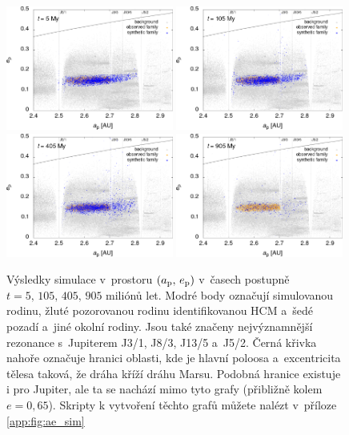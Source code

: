 \documentclass[A4paper, 12pt, oneside]{book}
\begin{document}
\immediate{}
\immediate{}
\immediate{}
\immediate{}
\begin{figure}
	\centering
	\includegraphics[width=0.49\textwidth]{obr/ae_5t.png}
	\includegraphics[width=0.49\textwidth]{obr/ae_105t.png}\\
	\includegraphics[width=0.49\textwidth]{obr/ae_405t.png}
	\includegraphics[width=0.49\textwidth]{obr/ae_905t.png}
	\caption{Výsledky simulace v~prostoru $(a_{\rm p},\,e_{\rm p})$ v~časech postupně $t=5,\,105,\,405,\,905$ miliónů let. Modré body označují simulovanou rodinu, žluté pozorovanou rodinu identifikovanou HCM a~šedé pozadí a~jiné okolní rodiny. Jsou také značeny nejvýznamnější rezonance s~Jupiterem J3/1, J8/3, J13/5 a~J5/2. Černá křivka nahoře označuje hranici oblasti, kde je hlavní poloosa a~excentricita tělesa taková, že dráha kříží dráhu Marsu. Podobná hranice existuje i pro Jupiter, ale ta se nachází mimo tyto grafy (přibližně kolem $e=0,65$). Skripty k vytvoření těchto grafů můžete nalézt v~příloze \ref{app:fig:ae_sim}} \label{fig:ae_sim}
\end{figure}	
\end{document}

